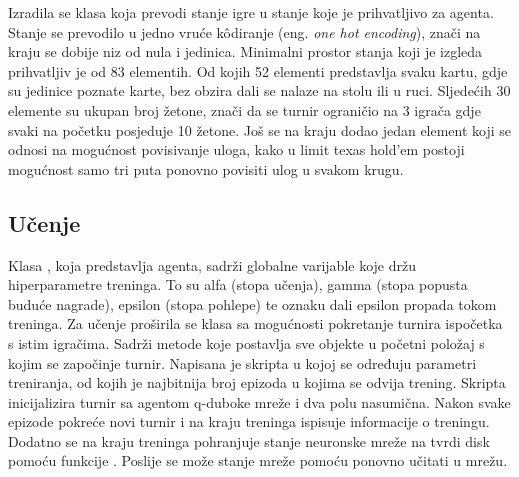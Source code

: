 Izradila se klasa koja prevodi stanje igre u stanje koje je prihvatljivo za agenta. Stanje se prevodilo u jedno vruće k\^odiranje (eng. \textit{one hot encoding}), znači na kraju se dobije niz od nula i jedinica.  Minimalni prostor stanja koji je izgleda prihvatljiv je od 83 elementih. Od kojih 52 elementi predstavlja svaku kartu, gdje su jedinice poznate karte, bez obzira dali se nalaze na stolu ili u ruci. Sljedećih 30 elemente su ukupan broj žetone, znači da se turnir ograničio na 3 igrača gdje svaki na početku posjeduje 10 žetone. Još se na kraju dodao jedan element koji se odnosi na mogućnost povisivanje uloga, kako u limit texas hold'em postoji mogućnost samo tri puta ponovno povisiti ulog u svakom krugu.

\subsection{Učenje}
Klasa , koja predstavlja agenta, sadrži globalne varijable koje držu hiperparametre treninga. To su alfa (stopa učenja), gamma (stopa popusta buduće nagrade), epsilon (stopa pohlepe) te oznaku dali epsilon propada tokom treninga. Za učenje proširila se klasa  sa mogućnosti pokretanje turnira ispočetka s istim igračima. Sadrži metode koje postavlja sve objekte u početni položaj s kojim se započinje turnir. Napisana je skripta u kojoj se određuju parametri treniranja, od kojih je najbitnija broj epizoda u kojima se odvija trening. Skripta inicijalizira turnir sa agentom q-duboke mreže i dva polu nasumična. Nakon svake epizode pokreće novi turnir i na kraju treninga ispisuje informacije o treningu. Dodatno se na kraju treninga pohranjuje stanje neuronske mreže na tvrdi disk pomoću funkcije . Poslije se može stanje mreže pomoću  ponovno učitati u mrežu. 

